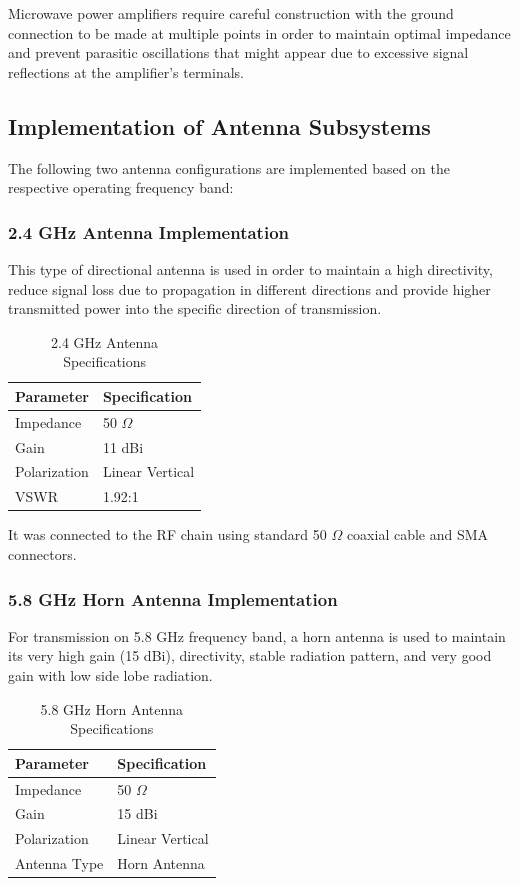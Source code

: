 \documentclass[12pt,a4paper]{report}
\begin{document}
	Microwave power amplifiers require careful construction with the ground connection to be made at multiple points in order to maintain optimal impedance and prevent parasitic oscillations that might appear due to excessive signal reflections at the amplifier's terminals.
	\subsection{Implementation of Antenna Subsystems}
	The following two antenna configurations are implemented based on the respective operating frequency band:
	\subsubsection{2.4 GHz Antenna Implementation}
	This type of directional antenna is used in order to maintain a high directivity, reduce signal loss due to propagation in different directions and provide higher transmitted power into the specific direction of transmission.
	
	\begin{table}[htbp]
		\centering
		\caption{2.4 GHz Antenna Specifications}
		\label{tab:ant_imp_2.4}
		\begin{tabular}{p{5cm} p{5cm}}
			\toprule
			\textbf{Parameter} & \textbf{Specification} \\
			\midrule
			Impedance & 50 $\Omega$ \\
			Gain & 11 dBi \\
			Polarization & Linear Vertical \\
			VSWR & 1.92:1 \\
			\bottomrule
		\end{tabular}
	\end{table}
	
	It was connected to the RF chain using standard 50 $\Omega$ coaxial cable and SMA connectors.
	\subsubsection{5.8 GHz Horn Antenna Implementation}
	For transmission on 5.8 GHz frequency band, a horn antenna is used to maintain its very high gain (15 dBi), directivity, stable radiation pattern, and very good gain with low side lobe radiation.
	
	\begin{table}[htbp]
		\centering
		\caption{5.8 GHz Horn Antenna Specifications}
		\label{tab:ant_imp_5.8}
		\begin{tabular}{p{5cm} p{5cm}}
			\toprule
			\textbf{Parameter} & \textbf{Specification} \\
			\midrule
			Impedance & 50 $\Omega$ \\
			Gain & 15 dBi \\
			Polarization & Linear Vertical \\
			Antenna Type & Horn Antenna \\
			\bottomrule
		\end{tabular}
	\end{table}
	
\end{document}
